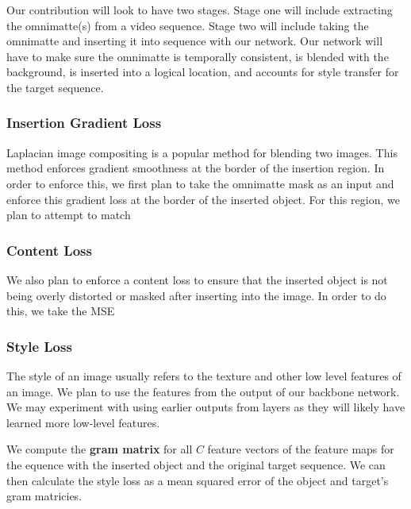\documentclass{article}
\begin{document}

Our contribution will look to have two stages. Stage one will include extracting the omnimatte(s) from a video sequence. Stage two will include taking the omnimatte and inserting it into sequence with our network. Our network will have to make sure the omnimatte is temporally consistent, is blended with the background, is inserted into a logical location, and accounts for style transfer for the target sequence.


\subsubsection{Insertion Gradient Loss}
Laplacian image compositing is a popular method for blending two images. This method enforces gradient smoothness at the border of the insertion region. In order to enforce this, we first plan to take the omnimatte mask as an input and enforce this gradient loss at the border of the inserted object. For this region, we plan to attempt to match  

\subsubsection{Content Loss}
We also plan to enforce a content loss to ensure that the inserted object is not being overly distorted or masked after inserting into the image. In order to do this, we take the MSE 

\subsubsection{Style Loss}
The style of an image usually refers to the texture and other low level features of an image. We plan to use the features from the output of our backbone network. We may experiment with using earlier outputs from layers as they will likely have learned more low-level features.

We compute the \textbf{gram matrix} for all $C$ feature vectors of the feature maps for the equence with the inserted object and the original target sequence. We can then calculate the style loss as a mean squared error of the object and target's gram matricies.
\end{document}
